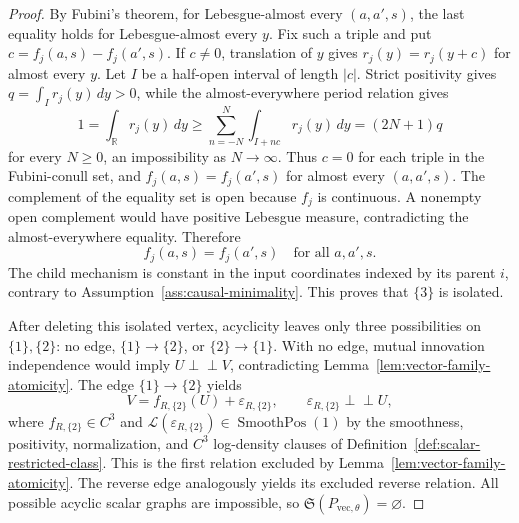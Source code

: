 \documentclass{article}
\begin{document}
\begin{proof}
By Fubini's theorem, for Lebesgue-almost every \((a,a',s)\), the last equality holds for Lebesgue-almost every \(y\).  Fix such a triple and put \(c=f_j(a,s)-f_j(a',s)\).  If \(c\ne0\), translation of \(y\) gives \(r_j(y)=r_j(y+c)\) for almost every \(y\).  Let \(I\) be a half-open interval of length \(|c|\).  Strict positivity gives \(q=\int_I r_j(y)\,dy>0\), while the almost-everywhere period relation gives
\[
 1=\int_{\mathbb R}r_j(y)\,dy
 \ge \sum_{n=-N}^{N}\int_{I+nc}r_j(y)\,dy
 =(2N+1)q
\]
for every \(N\ge0\), an impossibility as \(N\to\infty\).  Thus \(c=0\) for each triple in the Fubini-conull set, and \(f_j(a,s)=f_j(a',s)\) for almost every \((a,a',s)\).  The complement of the equality set is open because \(f_j\) is continuous.  A nonempty open complement would have positive Lebesgue measure, contradicting the almost-everywhere equality.  Therefore
\[
 f_j(a,s)=f_j(a',s)\quad\text{for all }a,a',s.
\]
The child mechanism is constant in the input coordinates indexed by its parent \(i\), contrary to Assumption~\ref{ass:causal-minimality}.  This proves that \(\{3\}\) is isolated.

After deleting this isolated vertex, acyclicity leaves only three possibilities on \(\{1\},\{2\}\): no edge, \(\{1\}\to\{2\}\), or \(\{2\}\to\{1\}\).  With no edge, mutual innovation independence would imply \(U\perp\!\!\!\perp V\), contradicting Lemma~\ref{lem:vector-family-atomicity}.  The edge \(\{1\}\to\{2\}\) yields
\[
 V=f_{R,\{2\}}(U)+\varepsilon_{R,\{2\}},
 \qquad \varepsilon_{R,\{2\}}\perp\!\!\!\perp U,
\]
where \(f_{R,\{2\}}\in C^3\) and \(\mathcal L(\varepsilon_{R,\{2\}})\in\operatorname{SmoothPos}(1)\) by the smoothness, positivity, normalization, and \(C^3\) log-density clauses of Definition~\ref{def:scalar-restricted-class}.  This is the first relation excluded by Lemma~\ref{lem:vector-family-atomicity}.  The reverse edge analogously yields its excluded reverse relation.  All possible acyclic scalar graphs are impossible, so \(\mathfrak S(P_{\mathrm{vec},\theta})=\varnothing\).
\end{proof}
\end{document}
